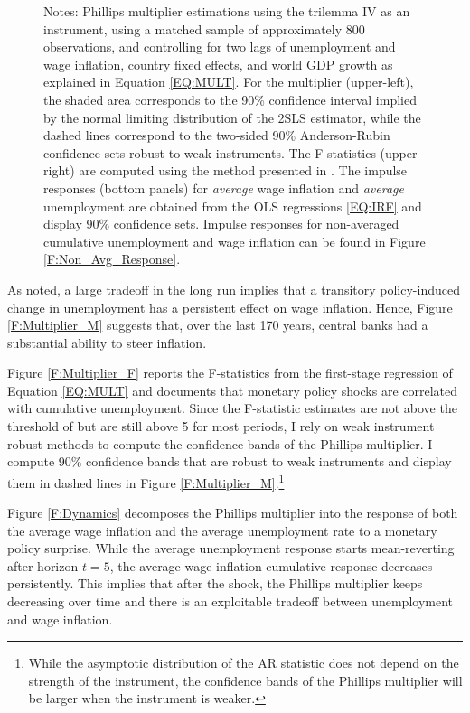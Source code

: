 \documentclass[12pt]{article}
\newcommand{\annote}[1]{\parbox{\textwidth}{\renewcommand{\baselinestretch}{1.0}\vspace{12pt} \footnotesize Notes: #1}}
\begin{document}
\begin{figure}[h!]
\begin{subfigure}[b]{0.9\textwidth}
		\end{subfigure}
		\annote{Phillips multiplier estimations using the trilemma IV as an instrument, using a matched sample of approximately 800 observations, and controlling for two lags of unemployment and wage inflation, country fixed effects, and world GDP growth as explained in Equation \eqref{EQ:MULT}. For the multiplier (upper-left), the shaded area corresponds to the 90\% confidence interval implied by the normal limiting distribution of the 2SLS estimator, while the dashed lines correspond to the two-sided 90\% Anderson-Rubin confidence sets robust to weak instruments. The F-statistics (upper-right) are computed using the method presented in \cite{Olea2013}. The impulse responses (bottom panels) for \textit{average} wage inflation and \textit{average} unemployment are obtained from the OLS regressions \eqref{EQ:IRF} and display 90\% confidence sets. Impulse responses for non-averaged cumulative unemployment and wage inflation can be found in Figure \ref{F:Non_Avg_Response}.}
	
\end{figure}

As \cite{Barnichon2019} noted, a large tradeoff in the long run implies that a transitory policy-induced change in unemployment has a persistent effect on wage inflation. Hence, Figure \ref{F:Multiplier_M} suggests that, over the last 170 years, central banks had a substantial ability to steer inflation.

Figure \ref{F:Multiplier_F} reports the \cite{Olea2013} F-statistics from the first-stage regression of Equation \eqref{EQ:MULT} and documents that monetary policy shocks are correlated with cumulative unemployment. Since the F-statistic estimates are not above the threshold of \cite{Olea2013} but are still above 5 for most periods, I rely on weak instrument robust methods to compute the confidence bands of the Phillips multiplier. I compute 90\% \cite{Anderson1949} confidence bands that are robust to weak instruments and display them in dashed lines in Figure \ref{F:Multiplier_M}.\footnote{While the asymptotic distribution of the AR statistic does not depend on the strength of the instrument, the confidence bands of the Phillips multiplier will be larger when the instrument is weaker.}

Figure \ref{F:Dynamics} decomposes the Phillips multiplier into the response of both the average wage inflation and the average unemployment rate to a monetary policy surprise. While the average unemployment response starts mean-reverting after horizon $t=5$, the average wage inflation cumulative response decreases persistently. This implies that after the shock, the Phillips multiplier keeps decreasing over time and there is an exploitable tradeoff between unemployment and wage inflation.
\end{document}
